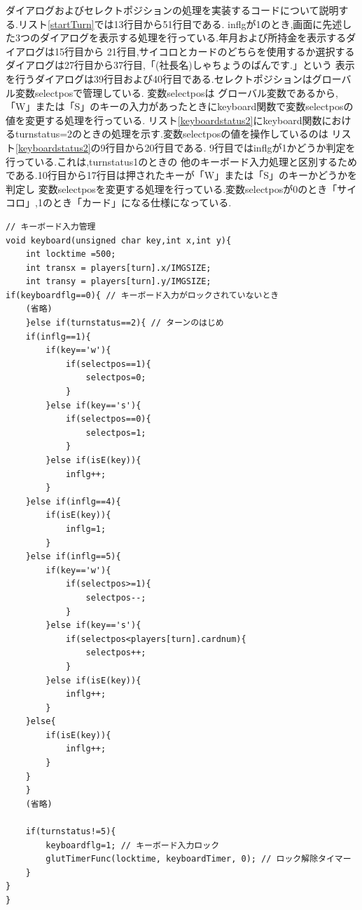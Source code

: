 \documentclass[a4j]{jarticle}
\begin{document}
        ダイアログおよびセレクトポジションの処理を実装するコードについて説明する.リスト\ref{startTurn}では13行目から51行目である.
        inflgが1のとき,画面に先述した3つのダイアログを表示する処理を行っている.年月および所持金を表示するダイアログは15行目から
        21行目,サイコロとカードのどちらを使用するか選択するダイアログは27行目から37行目,「(社長名)しゃちょうのばんです.」という
        表示を行うダイアログは39行目および40行目である.セレクトポジションはグローバル変数selectposで管理している. 変数selectposは
        グローバル変数であるから,「W」または「S」のキーの入力があったときにkeyboard関数で変数selectposの値を変更する処理を行っている.
        リスト\ref{keyboardstatus2}にkeyboard関数におけるturnstatus=2のときの処理を示す.変数selectposの値を操作しているのは
        リスト\ref{keyboardstatus2}の9行目から20行目である. 9行目ではinflgが1かどうか判定を行っている.これは,turnstatus1のときの
        他のキーボード入力処理と区別するためである.10行目から17行目は押されたキーが「W」または「S」のキーかどうかを判定し
        変数selectposを変更する処理を行っている.変数selectposが0のとき「サイコロ」,1のとき「カード」になる仕様になっている.
        \begin{lstlisting}[basicstyle=\ttfamily\footnotesize, frame=single,label=keyboardstatus2,caption=ターンのはじめのキーボード入力の処理]
// キーボード入力管理
void keyboard(unsigned char key,int x,int y){
    int locktime =500;
    int transx = players[turn].x/IMGSIZE;
    int transy = players[turn].y/IMGSIZE;
if(keyboardflg==0){ // キーボード入力がロックされていないとき
    (省略)
    }else if(turnstatus==2){ // ターンのはじめ
    if(inflg==1){
        if(key=='w'){
            if(selectpos==1){
                selectpos=0;
            }   
        }else if(key=='s'){
            if(selectpos==0){
                selectpos=1;
            }
        }else if(isE(key)){
            inflg++;
        }
    }else if(inflg==4){
        if(isE(key)){
            inflg=1;
        }        
    }else if(inflg==5){
        if(key=='w'){
            if(selectpos>=1){
                selectpos--;
            }   
        }else if(key=='s'){
            if(selectpos<players[turn].cardnum){
                selectpos++;
            }
        }else if(isE(key)){
            inflg++;
        }        
    }else{
        if(isE(key)){
            inflg++;
        }        
    }
    }
    (省略)

    if(turnstatus!=5){
        keyboardflg=1; // キーボード入力ロック
        glutTimerFunc(locktime, keyboardTimer, 0); // ロック解除タイマー
    }
}
}
        \end{lstlisting}   
\end{document}
